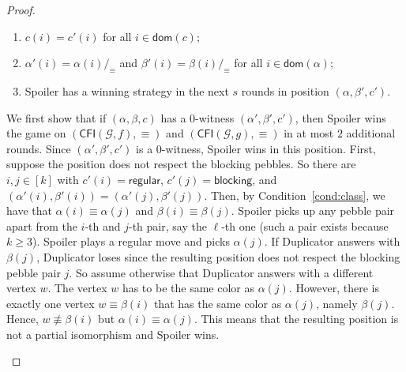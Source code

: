 \documentclass[a4paper,english, thm-restate]{lipics-v2021}
\newcommand{\regular}{\mathsf{regular}}
\newcommand{\blocking}{\mathsf{blocking}}
\newcommand{\comp}{\equiv}
\newcommand{\CFIsym}{\mathsf{CFI}}
\newcommand{\CFI}[1]{\CFIsym(#1)}
\newcommand{\precompCFI}[2]{{(\CFI{#1},#2)}}
\newcommand{\graphG}{\mathcal{G}}
\newcommand{\dom}{\mathsf{dom}}
\begin{document}
\begin{proof}
\begin{enumerate}
\begin{enumerate}
                \item $c(i) = c'(i)$ for all $i\in \dom(c)$;
                \item \label{cond:class}$\alpha'(i) = \alpha(i)/_\comp$ and $\beta'(i) = \beta(i)/_\comp$
                for all $i \in \dom(\alpha)$;
                \item Spoiler has a winning strategy in the next $s$  rounds in position $(\alpha,\beta',c')$. 
        \end{enumerate}
        
        
        We first show that if $(\alpha,\beta,c)$ has a $0$-witness $(\alpha',\beta',c')$,
        then Spoiler wins the game on $\precompCFI{\graphG,f}{\comp}$ and $\precompCFI{\graphG,g}{\comp}$ in at most $2$ additional rounds.
        Since $(\alpha',\beta',c')$ is a $0$-witness, Spoiler wins in this position.
        First, suppose the position does not respect the blocking pebbles.
        So there are $i,j\in[k]$ with $c'(i) = \regular$, $c'(j) = \blocking$, and
        $(\alpha'(i),\beta'(i)) = (\alpha'(j), \beta'(j))$.
        Then, by Condition~\ref{cond:class},
        we have that $\alpha(i) \comp \alpha(j)$ and  $\beta(i) \comp \beta(j)$.
        Spoiler picks up any pebble pair apart from the $i$-th and $j$-th pair,
        say the $\ell$-th one (such a pair exists because $k \geq 3$).
        Spoiler plays a regular move and picks $\alpha(j)$.
        If Duplicator answers with $\beta(j)$,
        Duplicator loses since the resulting position does not respect the blocking pebble pair $j$.
        So assume otherwise that Duplicator answers with a different vertex $w$.
        The vertex $w$ has to be the same color as $\alpha(j)$.
        However, there is exactly one vertex $w \comp \beta(i)$
        that has the same color as $\alpha(j)$, namely $\beta(j)$.
        Hence, $w \not\comp \beta(i)$ but $\alpha(i) \comp\alpha(j)$.
        This means that the resulting position is not a partial isomorphism
        and Spoiler wins.
        

\end{enumerate}
\end{proof}
\end{document}
